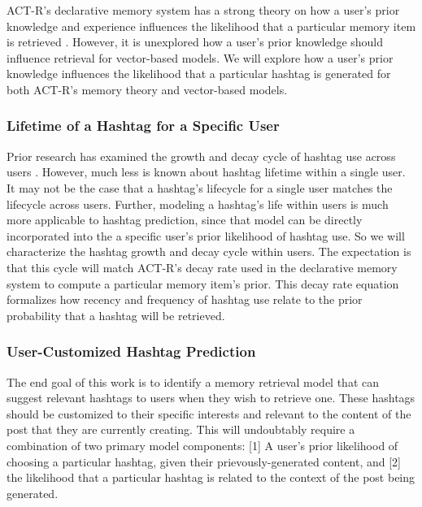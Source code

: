 \documentclass[man]{apa6}
\begin{document}
ACT-R's declarative memory system has a strong theory on how a user's prior knowledge and experience influences the likelihood that a particular memory item is retrieved \parencite{Anderson2004}.
However, it is unexplored how a user's prior knowledge should influence retrieval for vector-based models.
We will explore how a user's prior knowledge influences the likelihood that a particular hashtag is generated for both ACT-R's memory theory and vector-based models.

\subsubsection{Lifetime of a Hashtag for a Specific User}

Prior research has examined the growth and decay cycle of hashtag use across users \parencite{Tsur2012}.
However, much less is known about hashtag lifetime within a single user.
It may not be the case that a hashtag's lifecycle for a single user matches the lifecycle across users.
Further, modeling a hashtag's life within users is much more applicable to hashtag prediction, since that model can be directly incorporated into the a specific user's prior likelihood of hashtag use.
So we will characterize the hashtag growth and decay cycle within users.
The expectation is that this cycle will match ACT-R's decay rate used in the declarative memory system to compute a particular memory item's prior.
This decay rate equation formalizes how recency and frequency of hashtag use relate to the prior probability that a hashtag will be retrieved.

\subsubsection{User-Customized Hashtag Prediction}

The end goal of this work is to identify a memory retrieval model that can suggest relevant hashtags to users when they wish to retrieve one.
These hashtags should be customized to their specific interests and relevant to the content of the post that they are currently creating.
This will undoubtably require a combination of two primary model components:
[1] A user's prior likelihood of choosing a particular hashtag, given their prievously-generated content, and [2] the likelihood that a particular hashtag is related to the context of the post being generated. 
\end{document}
